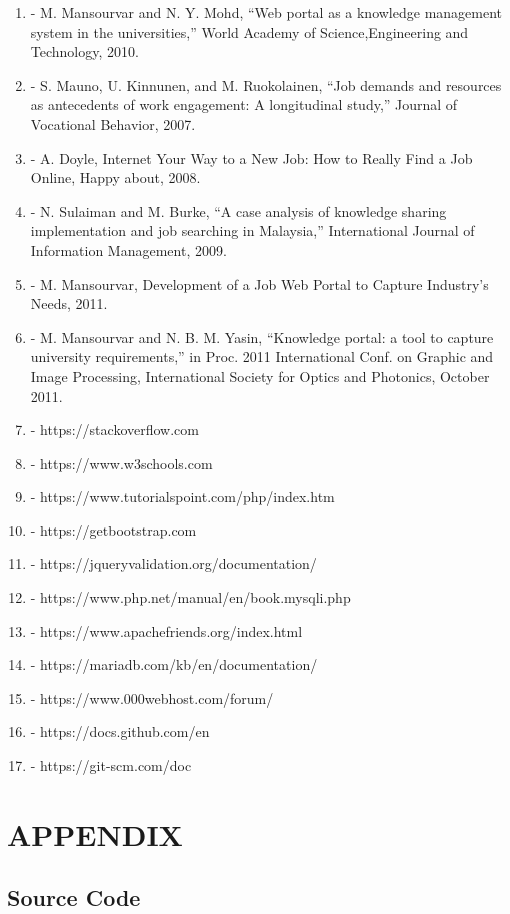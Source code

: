 \documentclass[a4paper,12pt]{report}
\begin{document}
\begin{enumerate}
\item - M. Mansourvar and N. Y. Mohd, “Web portal as a knowledge management system in the universities,” World Academy of Science,Engineering and Technology, 2010.
\item - S. Mauno, U. Kinnunen, and M. Ruokolainen, “Job demands and resources as antecedents of work engagement: A longitudinal study,” Journal of Vocational Behavior, 2007.
\item - A. Doyle, Internet Your Way to a New Job: How to Really Find a Job Online, Happy about, 2008.
\item - N. Sulaiman and M. Burke, “A case analysis of knowledge sharing implementation and job searching in Malaysia,” International Journal of Information Management, 2009.
\item - M. Mansourvar, Development of a Job Web Portal to Capture Industry’s Needs, 2011.
\item - M. Mansourvar and N. B. M. Yasin, “Knowledge portal: a tool to capture university requirements,” in Proc. 2011 International Conf. on Graphic and Image Processing, International Society for Optics and Photonics, October 2011.

	\item - https://stackoverflow.com
	\item - https://www.w3schools.com
	\item - https://www.tutorialspoint.com/php/index.htm
	\item - https://getbootstrap.com
	\item - https://jqueryvalidation.org/documentation/
	\item - https://www.php.net/manual/en/book.mysqli.php
	\item - https://www.apachefriends.org/index.html
	\item -	https://mariadb.com/kb/en/documentation/
	\item -	https://www.000webhost.com/forum/
	\item -	https://docs.github.com/en
	\item -	https://git-scm.com/doc
\end{enumerate} 
\pagebreak

\chapter{APPENDIX}


\section{Source Code}
\end{document}
